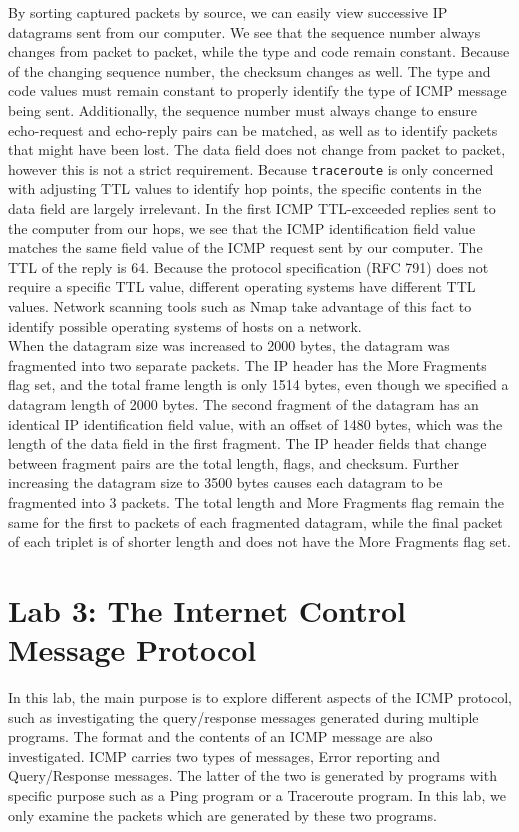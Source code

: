 \documentclass[10pt]{IEEEtran}
\begin{document}
 By sorting captured packets by source, we can easily view successive IP datagrams sent from our computer. We see that the sequence number always changes from packet to packet, while the type and code remain constant. Because of the changing sequence number, the checksum changes as well. The type and code values must remain constant to properly identify the type of ICMP message being sent. Additionally, the sequence number must always change to ensure echo-request and echo-reply pairs can be matched, as well as to identify packets that might have been lost. The data field does not change from packet to packet, however this is not a strict requirement. Because {\tt traceroute} is only concerned with adjusting TTL values to identify hop points, the specific contents in the data field are largely irrelevant. In the first ICMP TTL-exceeded replies sent to the computer from our hops, we see that the ICMP identification field value matches the same field value of the ICMP request sent by our computer. The TTL of the reply is 64. Because the protocol specification (RFC 791) does not require a specific TTL value, different operating systems have different TTL values. Network scanning tools such as Nmap take advantage of this fact to identify possible operating systems of hosts on a network.\\
 
 When the datagram size was increased to 2000 bytes, the datagram was fragmented into two separate packets. The IP header has the More Fragments flag set, and the total frame length is only 1514 bytes, even though we specified a datagram length of 2000 bytes. The second fragment of the datagram has an identical IP identification field value, with an offset of 1480 bytes, which was the length of the data field in the first fragment. The IP header fields that change between fragment pairs are the total length, flags, and checksum. Further increasing the datagram size to 3500 bytes causes each datagram to be fragmented into 3 packets. The total length and More Fragments flag remain the same for the first to packets of each fragmented datagram, while the final packet of each triplet is of shorter length and does not have the More Fragments flag set.
 
 
\section{Lab 3: The Internet Control Message Protocol}
 In this lab, the main purpose is to explore different aspects of the ICMP protocol, such as investigating the query/response messages generated during multiple programs. The format and the contents of an ICMP message are also investigated. ICMP carries two types of messages, Error reporting and Query/Response messages. The latter of the two is generated by programs with specific purpose such as a Ping program or a Traceroute program. In this lab, we only examine the packets which are generated by these two programs.\\
 
\end{document}
